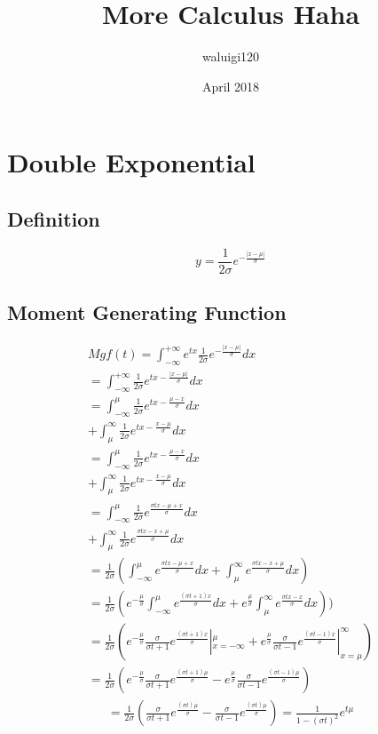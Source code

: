 \documentclass{article}
\title{More Calculus Haha}
\author{waluigi120 }
\date{April 2018}
\begin{document}
\maketitle

\section{Double Exponential}

\subsection{Definition}
$$y = \frac{1}{2\sigma} e^{-\frac{|x-\mu|}{\sigma}}$$

\subsection{Moment Generating Function}
\begin{align*}\label{eq:pareto mle2}
 Mgf(t) =\int_{-\infty}^{+\infty} e^{tx} \frac{1}{2\sigma} e^{-\frac{|x-\mu|}{\sigma}} dx\\ =\int_{-\infty}^{+\infty} \frac{1}{2\sigma} e^{tx-\frac{|x-\mu|}{\sigma}}dx \\ = \int_{-\infty}^{\mu} \frac{1}{2\sigma} e^{tx-\frac{\mu - x}{\sigma}} dx \\+ \int_{\mu}^{\infty} \frac{1}{2\sigma} e^{tx-\frac{x-\mu}{\sigma}} dx \\ = \int_{-\infty}^{\mu} \frac{1}{2\sigma} e^{tx-\frac{\mu - x}{\sigma}}dx \\+ \int_{\mu}^{\infty} \frac{1}{2\sigma} e^{tx-\frac{x-\mu}{\sigma}}dx\\ = \int_{-\infty}^{\mu} \frac{1}{2\sigma} e^{\frac{\sigma tx -\mu + x}{\sigma}}dx \\+ \int_{\mu}^{\infty} \frac{1}{2\sigma} e^{\frac{\sigma tx-x+\mu}{\sigma}}dx \\ = \frac{1}{2 \sigma}( \int_{-\infty}^{\mu}  e^{\frac{\sigma tx -\mu + x}{\sigma}}dx +  \int_{\mu}^{\infty}  e^{\frac{\sigma tx-x+\mu}{\sigma}}dx )\\ = \frac{1}{ 2\sigma} ( e^{-\frac{\mu}{\sigma}} \int_{-\infty}^{\mu} e^{\frac{(\sigma t + 1) x}{\sigma}} dx +  e^{\frac{\mu}{\sigma}} \int_{\mu}^{\infty}  e^{\frac{\sigma tx-x}{\sigma}}dx )) \\ =  \frac{1}{2 \sigma} (e^{-\frac{\mu}{\sigma}} \frac{\sigma}{\sigma t + 1} e^{\frac{(\sigma t + 1) x}{\sigma}} |_{x = -\infty}^{\mu}+e^{\frac{\mu}{\sigma}} \frac{\sigma}{\sigma t - 1} e^{\frac{(\sigma t - 1) x}{\sigma}} |_{x = \mu}^{\infty} ) \\ = \frac{1}{2\sigma} (e^{-\frac{\mu}{\sigma}} \frac{\sigma}{\sigma t + 1} e^{\frac{(\sigma t + 1) \mu}{\sigma}} - e^{\frac{\mu}{\sigma}} \frac{\sigma}{\sigma t - 1} e^{\frac{(\sigma t - 1) \mu}{\sigma}} )\end{align*}
\begin{align*}
 = \frac{1}{2\sigma} ( \frac{\sigma}{\sigma t + 1} e^{\frac{(\sigma t ) \mu}{\sigma}} -  \frac{\sigma}{\sigma t - 1} e^{\frac{(\sigma t) \mu}{\sigma}} ) =   \frac{1}{1-(\sigma t)^{2} } e^{ t  \mu}
\end{align*}
\end{document}
